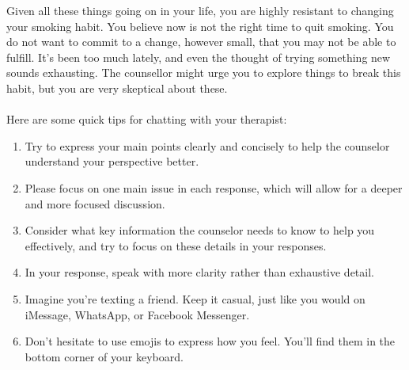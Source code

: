 \begin{tcolorbox}
Given all these things going on in your life, you are highly resistant to changing your smoking habit. You believe now is not the right time to quit smoking. You do not want to commit to a change, however small, that you may not be able to fulfill. It's been too much lately, and even the thought of trying something new sounds exhausting. The counsellor might urge you to explore things to break this habit, but you are very skeptical about these.\\\\

\vspace{5pt}
Here are some quick tips for chatting with your therapist:
\begin{enumerate}[itemsep=0pt, parsep=0pt]
    \item Try to express your main points clearly and concisely to help the counselor understand your perspective better.
    \item Please focus on one main issue in each response, which will allow for a deeper and more focused discussion.
    \item Consider what key information the counselor needs to know to help you effectively, and try to focus on these details in your responses.
    \item In your response, speak with more clarity rather than exhaustive detail.
    \item Imagine you're texting a friend. Keep it casual, just like you would on iMessage, WhatsApp, or Facebook Messenger.
    \item Don't hesitate to use emojis to express how you feel. You'll find them in the bottom corner of your keyboard.
\end{enumerate}



\end{tcolorbox}
